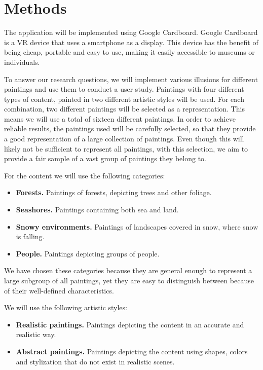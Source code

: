 \documentclass[a4paper]{article}
\begin{document}
\section{Methods} \label{sec:methods}

The application will be implemented using Google Cardboard. Google Cardboard is a VR device that uses a smartphone as a display. This device has the benefit of being cheap, portable and easy to use, making it easily accessible to museums or individuals.

To answer our research questions, we will implement various illusions for different paintings and use them to conduct a user study. Paintings with four different types of content, painted in two different artistic styles will be used. For each combination, two different paintings will be selected as a representation. This means we will use a total of sixteen different paintings. In order to achieve reliable results, the paintings used will be carefully selected, so that they provide a good representation of a large collection of paintings. Even though this will likely not be sufficient to represent all paintings, with this selection, we aim to provide a fair sample of a vast group of paintings they belong to.

For the content we will use the following categories:

\begin{itemize}
\item \textbf{Forests.} Paintings of forests, depicting trees and other foliage.
\item \textbf{Seashores.} Paintings containing both sea and land.
\item \textbf{Snowy environments.} Paintings of landscapes covered in snow, where snow is falling.
\item \textbf{People.} Paintings depicting groups of people.
\end{itemize}

We have chosen these categories because they are general enough to represent a large subgroup of all paintings, yet they are easy to distinguish between because of their well-defined characteristics.

We will use the following artistic styles:

\begin{itemize}
\item \textbf{Realistic paintings.} Paintings depicting the content in an accurate and realistic way.
\item \textbf{Abstract paintings.} Paintings depicting the content using shapes, colors and stylization that do not exist in realistic scenes.
\end{itemize}
\end{document}

